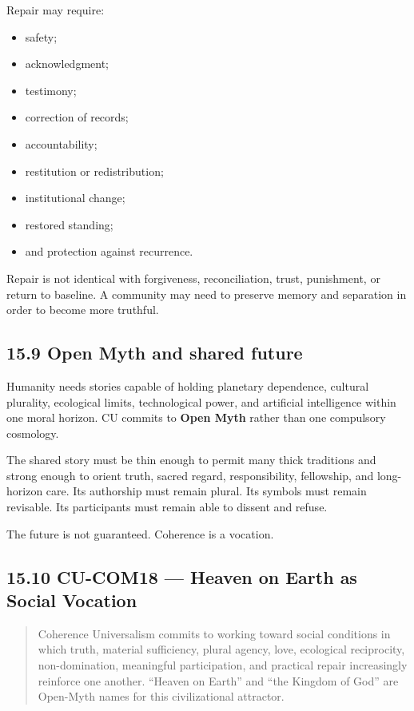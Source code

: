 \documentclass[
  11pt,
]{article}
\providecommand{\tightlist}{%
  \setlength{\itemsep}{0pt}\setlength{\parskip}{0pt}}
\begin{document}
Repair may require:

\begin{itemize}
\tightlist
\item
  safety;
\item
  acknowledgment;
\item
  testimony;
\item
  correction of records;
\item
  accountability;
\item
  restitution or redistribution;
\item
  institutional change;
\item
  restored standing;
\item
  and protection against recurrence.
\end{itemize}

Repair is not identical with forgiveness, reconciliation, trust,
punishment, or return to baseline. A community may need to preserve
memory and separation in order to become more truthful.

\subsection{15.9 Open Myth and shared
future}\label{open-myth-and-shared-future}

Humanity needs stories capable of holding planetary dependence, cultural
plurality, ecological limits, technological power, and artificial
intelligence within one moral horizon. CU commits to \textbf{Open Myth}
rather than one compulsory cosmology.

The shared story must be thin enough to permit many thick traditions and
strong enough to orient truth, sacred regard, responsibility,
fellowship, and long-horizon care. Its authorship must remain plural.
Its symbols must remain revisable. Its participants must remain able to
dissent and refuse.

The future is not guaranteed. Coherence is a vocation.

\subsection{15.10 CU-COM18 --- Heaven on Earth as Social
Vocation}\label{cu-com18-heaven-on-earth-as-social-vocation}

\begin{quote}
Coherence Universalism commits to working toward social conditions in
which truth, material sufficiency, plural agency, love, ecological
reciprocity, non-domination, meaningful participation, and practical
repair increasingly reinforce one another. ``Heaven on Earth'' and ``the
Kingdom of God'' are Open-Myth names for this civilizational attractor.
\end{quote}
\end{document}
